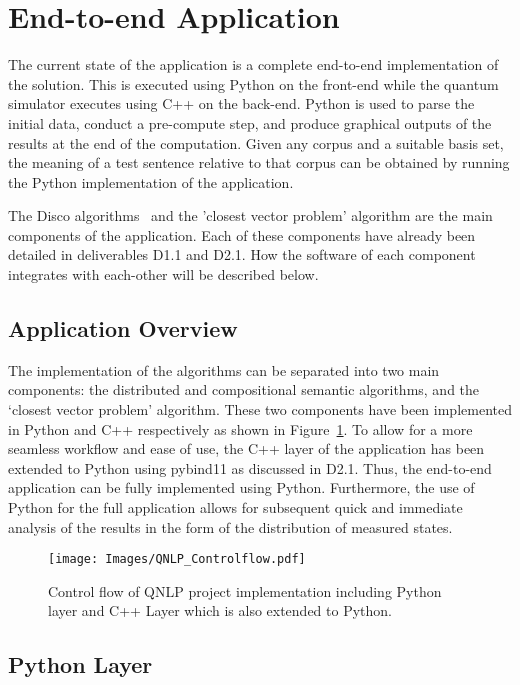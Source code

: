 \section{End-to-end Application}
\label{sed:End-to-end_Application}
The current state of the application is a complete end-to-end implementation of the solution. This is executed using Python on the front-end while the quantum simulator executes using C++ on the back-end. Python is used to parse the initial data, conduct a pre-compute step, and produce graphical outputs of the results at the end of the computation. Given any corpus and a suitable basis set, the meaning of a test sentence relative to that corpus can be obtained by running the Python implementation of the application.

The Disco algorithms~\cite{Zeng_Coecke_2016, clark_coecke_sadrzadeh_2010, Coecke_Sadrzadeh_Clark_2010} and the 'closest vector problem' algorithm are the main components of the application. Each of these components have already been detailed in deliverables D1.1 and D2.1. How the software of each component integrates with each-other will be described below. 

\subsection{Application Overview}
\label{sec:Application_Overview}
The implementation of the algorithms can be separated into two main components: the distributed and compositional semantic algorithms, and the `closest vector problem' algorithm. These two components have been implemented in Python and C++ respectively as shown in Figure~\ref{fig:qnlp_controlflow}. To allow for a more seamless workflow and ease of use, the C++ layer of the application has been extended to Python using pybind11 as discussed in D2.1. Thus, the end-to-end application can be fully implemented using Python. Furthermore, the use of Python for the full application allows for subsequent quick and immediate analysis of the results in the form of the distribution of measured states.

\begin{figure}[!ht]
    \centering
    \texttt{[image: Images/QNLP\_Controlflow.pdf]}
    \caption{Control flow of QNLP project implementation including Python layer and C++ Layer which is also extended to Python.}
    \label{fig:qnlp_controlflow}
\end{figure}


\subsection{Python Layer}
\label{sec:Python_Layer}

